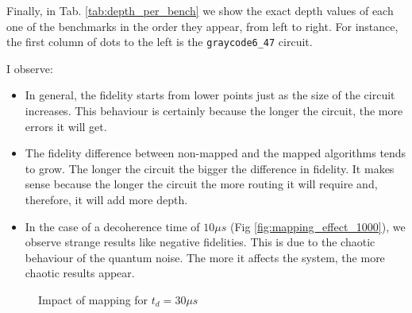 Finally, in Tab. \ref{tab:depth_per_bench} we show the exact depth values of each one of the benchmarks in the order they appear, from left to right.
For instance, the first column of dots to the left is the \texttt{graycode6\_47} circuit.


I observe:

\begin{itemize}
\item In general, the fidelity starts from lower points just as the size of the circuit increases. This behaviour is certainly because the longer the circuit, the more errors it will get.
\item The fidelity difference between non-mapped and the mapped algorithms tends to grow. The longer the circuit the bigger the difference in fidelity. It makes sense because the longer the circuit the more routing it will require and, therefore, it will add more depth.
\item In the case of a decoherence time of \(10 \mu s\) (Fig \ref{fig:mapping_effect_1000}), we observe strange results like negative fidelities. This is due to the chaotic behaviour of the quantum noise. The more it affects the system, the more chaotic results appear.
\end{itemize}


\begin{figure}
\centering
{}


\caption{Impact of mapping for $t_d = 30 \mu s$}
\label{fig:mapping_effect_3000}
\end{figure}


